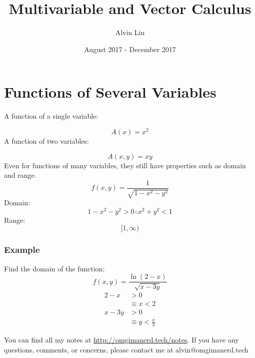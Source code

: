 \documentclass[letterpaper, 12pt]{math}
\title{Multivariable and Vector Calculus}
\author{Alvin Lin}
\date{August 2017 - December 2017}
\begin{document}
\maketitle

\section*{Functions of Several Variables}
A function of a single variable:
\begin{center}
\end{center}
\[ A(x) = x^2 \]
A function of two variables:
\begin{center}
\end{center}
\[ A(x,y) = xy \]
Even for functions of many variables, they still have properties such as domain
and range.
\[ f(x,y) = \frac{1}{\sqrt{1-x^2-y^2}} \]
Domain:
\[ 1-x^2-y^2 > 0 \therefore x^2+y^2 < 1 \]
Range:
\[ [1,\infty) \]

\subsubsection*{Example}
Find the domain of the function:
\[ f(x,y) = \frac{\ln(2-x)}{\sqrt{x-3y}} \]
\begin{align*}
  2-x &> 0 \\
  &\equiv x < 2\\
  x-3y &> 0 \\
  &\equiv y < \frac{x}{3}
\end{align*}
\begin{center}
\end{center}

\begin{center}
  You can find all my notes at \url{http://omgimanerd.tech/notes}. If you have
  any questions, comments, or concerns, please contact me at
  alvin@omgimanerd.tech
\end{center}
\end{document}
